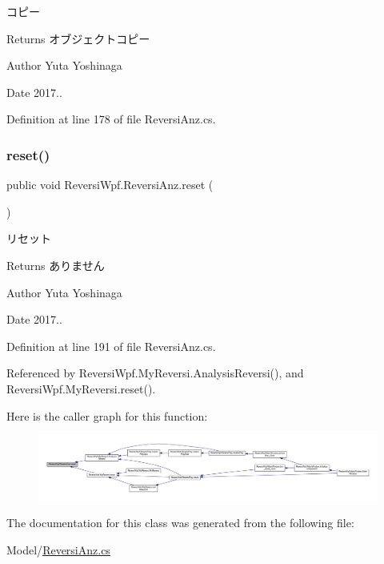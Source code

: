 コピー 

\begin{DoxyReturn}{Returns}
オブジェクトコピー 
\end{DoxyReturn}
\begin{DoxyAuthor}{Author}
Yuta Yoshinaga 
\end{DoxyAuthor}
\begin{DoxyDate}{Date}
2017.. 
\end{DoxyDate}


Definition at line 178 of file Reversi\+Anz.\+cs.

\mbox{\label{class_reversi_wpf_1_1_reversi_anz_a436fc0f66a511af5d589fe2ef493c8af}} 
\subsubsection{\texorpdfstring{reset()}{reset()}}
{\footnotesize\ttfamily public void Reversi\+Wpf.\+Reversi\+Anz.\+reset (\begin{DoxyParamCaption}{ }\end{DoxyParamCaption})}



リセット 

\begin{DoxyReturn}{Returns}
ありません 
\end{DoxyReturn}
\begin{DoxyAuthor}{Author}
Yuta Yoshinaga 
\end{DoxyAuthor}
\begin{DoxyDate}{Date}
2017.. 
\end{DoxyDate}


Definition at line 191 of file Reversi\+Anz.\+cs.



Referenced by Reversi\+Wpf.\+My\+Reversi.\+Analysis\+Reversi(), and Reversi\+Wpf.\+My\+Reversi.\+reset().

Here is the caller graph for this function\+:
\nopagebreak
\begin{figure}[H]
\begin{center}
\leavevmode
\includegraphics[width=350pt]{class_reversi_wpf_1_1_reversi_anz_a436fc0f66a511af5d589fe2ef493c8af_icgraph}
\end{center}
\end{figure}


The documentation for this class was generated from the following file\+:\begin{DoxyCompactItemize}
\item 
Model/\hyperlink{_reversi_anz_8cs}{Reversi\+Anz.\+cs}\end{DoxyCompactItemize}
